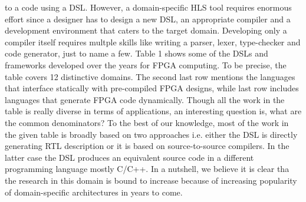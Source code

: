 to a code using a DSL. However, a domain-specific HLS tool requires enormous effort since a designer has to design a new DSL, an appropriate compiler and a development environment that caters to the target domain. Developing only a compiler itself requires multple skills like writing a parser, lexer, type-checker and code generator, just to name a few. \newline Table 1 shows some of the DSLs and frameworks developed over the years for FPGA computing. To be precise, the table covers 12 distinctive domains. The second last row mentions the languages that interface statically with pre-compiled FPGA designs, while last row includes languages that generate FPGA code dynamically. Though all the work in the table is really diverse in terms of applications, an interesting question is, what are the common denominators? To the best of our knowledge, most of the work in the given table is broadly based on two approaches i.e. either the DSL is directly generating RTL description or it is based on source-to-source compilers. In the latter case the DSL produces an equivalent source code in a different programming language mostly C/C++. In a nutshell, we believe it is clear tha the research in this domain is bound to increase because of increasing popularity of domain-specific architectures in years to come.
